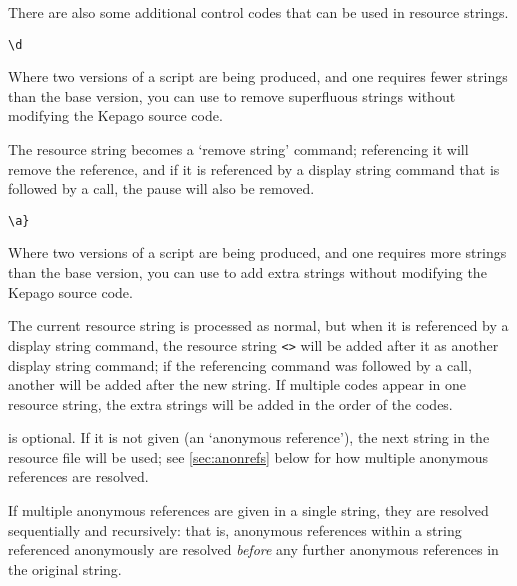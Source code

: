     There are also some additional control codes that can be used in resource
    strings.

    \lstinline|\d|
    \begin{cmdesc}
      Where two versions of a script are being produced, and one requires
      fewer strings than the base version, you can use  to remove
      superfluous strings without modifying the Kepago source code.

      The resource string becomes a `remove string' command; referencing it
      will remove the reference, and if it is referenced by a display string
      command that is followed by a  call, the pause will also be
      removed.
    \end{cmdesc}
    \lstinline|\a|\rawlbrace{}\lstinline|}|
    \begin{cmdesc}
      Where two versions of a script are being produced, and one requires
      more strings than the base version, you can use  to add extra
      strings without modifying the Kepago source code.

      The current resource string is processed as normal, but when it is
      referenced by a display string command, the resource string
      \lstinline|<|\lstinline|>| will be added after it as
      another display string command; if the referencing command was followed
      by a  call, another  will be added after the
      new string.  If multiple  codes appear in one resource string,
      the extra strings will be added in the order of the  codes.

       is optional.  If it is not given (an `anonymous
      reference'), the next string in the resource file will be used; see
      \ref{sec:anonrefs} below for how multiple anonymous references are
      resolved.
    \end{cmdesc}

  \label{sec:anonrefs}

    If multiple anonymous references are given in a single string, they are
    resolved sequentially and recursively: that is, anonymous references
    within a string referenced anonymously are resolved \emph{before} any
    further anonymous references in the original string.

